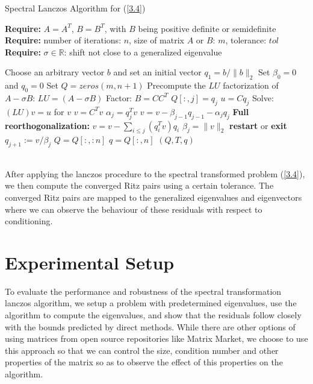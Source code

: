\documentclass[12pt,gsu,online,openany,singleside,hidelinks]{gsudiss}
\begin{document}
\begin{algorithm}
	\caption{Spectral Lanczos Algorithm for (\ref{3.4}) }
	\label{alg:spectral_lanczos_algorithm}
	
	\textbf{Require:} \( A = A^T \), \( B = B^T \), with \(B\) being positive definite or semidefinite\\
	\textbf{Require:} number of iterations: \(n\), size of matrix $A$ or $B$: $m$, tolerance: \(tol\)\\
	\textbf{Require:} \(\sigma \in \mathbb{R}\): shift not close to a generalized eigenvalue
	\begin{algorithmic}[1]
		\State Choose an arbitrary vector $b$ and set an initial vector $q_1 = b/ \|b\|_2$
		\State Set $\beta_0 = 0$ and $q_0 = 0$
		\State Set $Q = zeros(m, n+1)$
		\State Precompute the $LU$ factorization of $A - \sigma B$: $LU = (A - \sigma B)$
		\State Factor: $B = CC^T$
		\State $Q[:, j] = q_j$
		\State $u = Cq_j$
		\State Solve: $(LU)v = u$ for $v$
		\State $v = C^T v$
		\State $\alpha_j = q_j^T v $
		\State $v = v - \beta_{j-1}q_{j-1} - \alpha_j q_j$
		\State \textbf{Full reorthogonalization:} $v = v - \sum_{i \leq j} (q_i^T v) q_i$
		\State $\beta_{j} = \|v\|_2$
		\State \textbf{restart} or \textbf{exit}
		\EndIf
		\State $q_{j+1} := v / \beta_{j}$
		\EndIf
		\EndFor
		\State $Q = Q[:, :n]$
		\State $q = Q[:, n]$
		\State \Return $(Q, T, q)$
		\EndFunction
	\end{algorithmic}
\end{algorithm}\\
After applying the lanczos procedure to the spectral transformed problem (\ref{3.4}), we then compute the converged Ritz pairs using a certain tolerance. The converged Ritz pairs are mapped to the generalized eigenvalues and eigenvectors where we can observe the behaviour of these residuals with respect to conditioning.
\section{Experimental Setup}
To evaluate the performance and robustness of the spectral transformation lanczos algorithm, we setup a problem with predetermined eigenvalues, use the algorithm to compute the eigenvalues, and show that the residuals follow closely with the bounds predicted by direct methods. While there are other options of using matrices from open source repositories like Matrix Market, we choose to use this approach so that we can control the size, condition number and other properties of the matrix so as to observe the effect of this properties on the algorithm.
\end{document}
